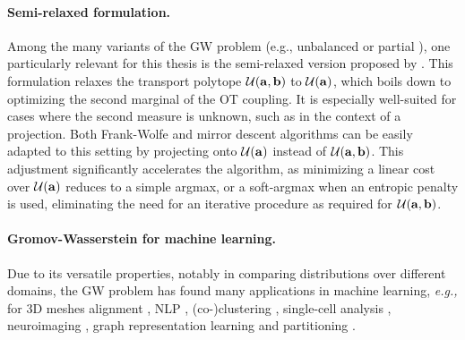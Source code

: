 \paragraph{Semi-relaxed formulation.} 
Among the many variants of the GW problem (e.g., unbalanced \citep{sejourne2021unbalanced} or partial \citep{chapel2020partial}), one particularly relevant for this thesis is the semi-relaxed version proposed by \cite{vincent2021semi}. This formulation relaxes the transport polytope ${\mathcal{U}}({\mathbf{a}}, {\mathbf{b}})$ to ${\mathcal{U}}({\mathbf{a}})$, which boils down to optimizing the second marginal of the OT coupling. It is especially well-suited for cases where the second measure is unknown, such as in the context of a projection. Both Frank-Wolfe and mirror descent algorithms can be easily adapted to this setting by projecting onto ${\mathcal{U}}({\mathbf{a}})$ instead of ${\mathcal{U}}({\mathbf{a}}, {\mathbf{b}})$. This adjustment significantly accelerates the algorithm, as minimizing a linear cost over ${\mathcal{U}}({\mathbf{a}})$ reduces to a simple argmax, or a soft-argmax when an entropic penalty is used, eliminating the need for an iterative procedure as required for ${\mathcal{U}}({\mathbf{a}}, {\mathbf{b}})$.


\paragraph{Gromov-Wasserstein for machine learning.}
Due to its versatile properties, notably in comparing distributions over different domains,  the GW problem has found many applications in machine learning, \textit{e.g.,} for 3D meshes alignment \citep{solomon2016entropic,ezuz2017gwcnn}, NLP \citep{alvarez2018gromov}, (co-)clustering  \citep{peyre2016gromov, redko2020co}, single-cell analysis \citep{demetci2020gromov}, neuroimaging \citep{thual2022aligning}, graph representation learning \citep{xu2020gromov, vincent2021online, liu2022robust, vincent2022template, pmlr-v202-zeng23c} and partitioning \citep{xu2019scalable, chowdhury2021generalized}.
